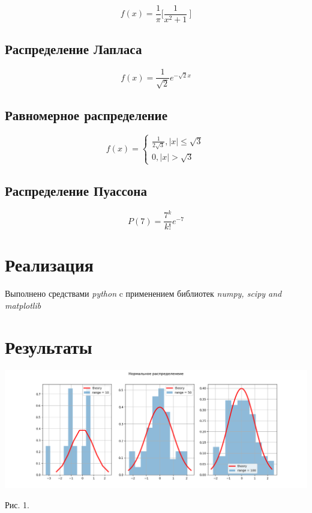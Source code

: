 \documentclass[12pt]{article}
\begin{document}
\begin{equation}
f(x)= \frac{1}{\pi}\bigg[ \frac{1}{x^2 + 1}\ \bigg]
\end{equation}

\subsection{Распределение Лапласа}

\begin{equation} 
f(x)= \frac{1}{\sqrt{2}}e^{-\sqrt{2}x}
\end{equation}

\subsection{Равномерное распределение}

\begin{equation}
      f(x) = 
      \begin{cases}
      \frac{1}{2\sqrt{3}}, |x| \leq \sqrt{3} \\
      0, |x| > \sqrt{3}
      \end{cases}
\end{equation}



\subsection{Распределение Пуассона}

\begin{equation} \label{eq5}
P(7) = \frac{7^k}{k!}e^{-7}
\end{equation}

\pagebreak

\section{Реализация}
Выполнено средствами \textit{python} c применением библиотек \textit{numpy, scipy and matplotlib}

\section{Результаты}

\includegraphics[width=\textwidth]{normal.png}
\begin{center}
Рис. 1. 
\end{center}
\end{document}
